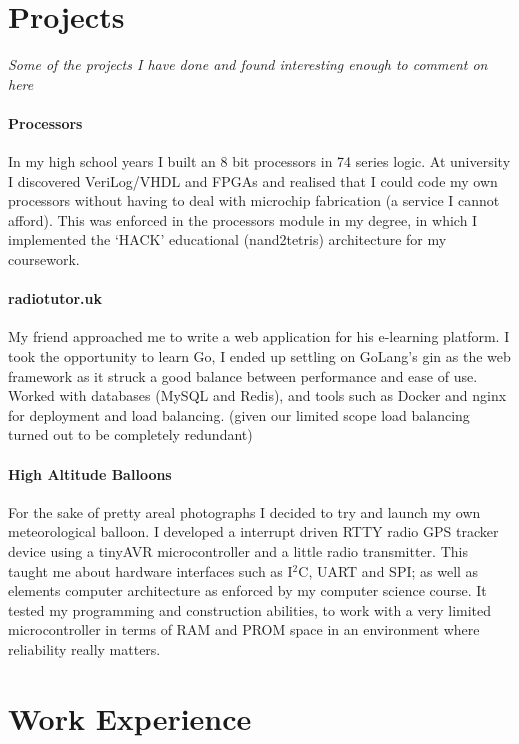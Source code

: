 \documentclass[9pt,a4paper]{article}
\begin{document}
\begin{multicols*}{2}
\section*{Projects}
\textit{Some of the projects I have done and found interesting enough to comment on here}

\paragraph{Processors} In my high school years I built an 8 bit processors in 74 series logic.
At university I discovered VeriLog/VHDL and FPGAs and realised that I could code my own processors without having to deal with microchip fabrication (a service I cannot afford).
This was enforced in the processors module in my degree, in which I implemented the `HACK' educational (nand2tetris) architecture for my coursework.

\paragraph{radiotutor.uk} My friend approached me to write a web application for his e-learning platform.
I took the opportunity to learn Go, I ended up settling on GoLang's gin as the web framework as it struck a good balance between performance and ease of use.
Worked with databases (MySQL and Redis), and tools such as Docker and nginx for deployment and load balancing. (given our limited scope load balancing turned out to be completely redundant)

\paragraph{High Altitude Balloons} For the sake of pretty areal photographs I decided to try and launch my own meteorological balloon.
I developed a interrupt driven RTTY radio GPS tracker device using a tinyAVR microcontroller and a little radio transmitter.
This taught me about hardware interfaces such as I$^2$C, UART and SPI;
as well as elements computer architecture as enforced by my computer science course.
It tested my programming and construction abilities, to work with a very limited microcontroller in terms of RAM and PROM space in an environment where reliability really matters.

\section*{Work Experience}


\end{multicols*}
\end{document}
